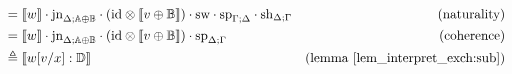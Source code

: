 \documentclass[10pt,a4paper]{amsart}
\theoremstyle{definition}
\theoremstyle{definition}
\theoremstyle{definition}
\theoremstyle{definition}
\theoremstyle{definition}
\theoremstyle{definition}
\begin{document}
\begin{align*}
  & = \llbracket w \rrbracket \cdot \text{jn}_{\Delta;\mathbb{A} \oplus \mathbb{B}} \cdot ( \text{id} \otimes \llbracket v \oplus \mathbb{B}\rrbracket )  \cdot  \text{sw}  \cdot  \text{sp}_{\Gamma;\Delta} \cdot \text{sh}_{\Delta;\Gamma}  & {\text{(naturality)}}\\
  &  = \llbracket w \rrbracket \cdot \text{jn}_{\Delta;\mathbb{A} \oplus \mathbb{B}} \cdot ( \text{id} \otimes \llbracket v \oplus \mathbb{B}\rrbracket )  \cdot  \text{sp}_{\Delta; \Gamma} & {\text{(coherence)}}\\
  & \triangleq \llbracket w[v/x] : \mathbb{D} \rrbracket & {\text{(lemma \ref{lem_interpret_exch:sub})}}
\end{align*}

\newpage
 

\end{document}
